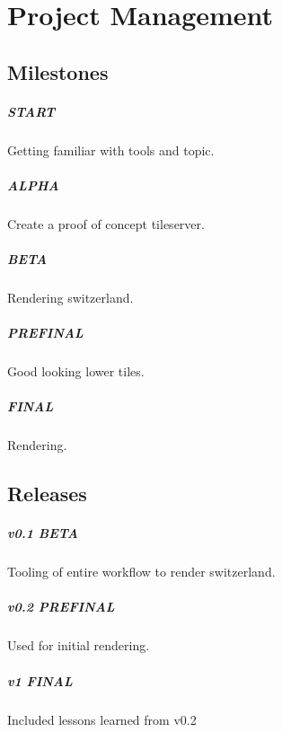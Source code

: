 \chapter{Project Management}\label{project-management}

\section{Milestones}

\paragraph{START}
Getting familiar with tools and topic.

\paragraph{ALPHA}
Create a proof of concept tileserver.

\paragraph{BETA}
Rendering switzerland.

\paragraph{PREFINAL}
Good looking lower tiles.

\paragraph{FINAL}
Rendering.

\section{Releases}

\paragraph{v0.1 BETA}
Tooling of entire workflow to render switzerland.

\paragraph{v0.2 PREFINAL}
Used for initial rendering.

\paragraph{v1 FINAL}
Included lessons learned from v0.2

